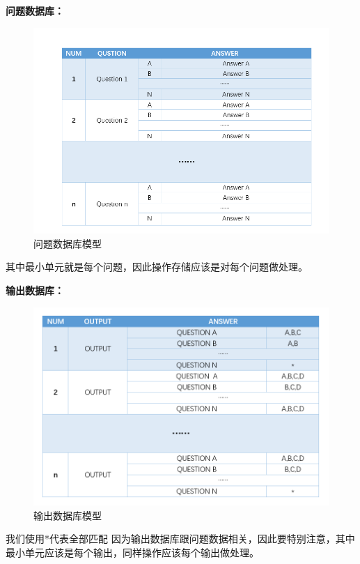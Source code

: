 \documentclass[UTF8,18pt]{ctexart}
\begin{document}
{\textbf{问题数据库：}
\begin{figure}[H]
	\centering
	\includegraphics[scale=0.4]{ds1.png}
	\caption{问题数据库模型}
	\label{fig:问题数据库模型}
\end{figure}
其中最小单元就是每个问题，因此操作存储应该是对每个问题做处理。

\textbf{输出数据库：}
\begin{figure}[H]
	\centering
	\includegraphics[scale=0.4]{ds2.png}
	\caption{输出数据库模型}
	\label{fig:输出数据库模型}
\end{figure}
我们使用*代表全部匹配
因为输出数据库跟问题数据相关，因此要特别注意，其中最小单元应该是每个输出，同样操作应该每个输出做处理。
}
\end{document}
